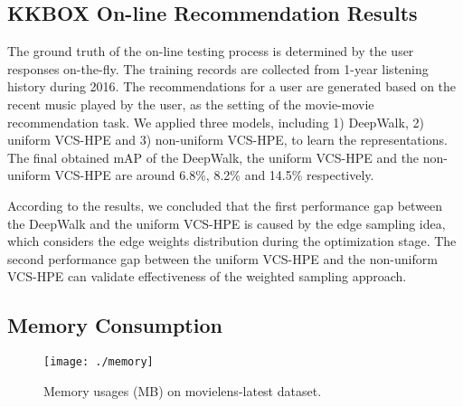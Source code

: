 \subsection{KKBOX On-line Recommendation Results}

The ground truth of the on-line testing process is determined by the user responses on-the-fly.  The training records are collected from 1-year listening history during 2016.  The recommendations for a user are generated based on the recent music played by the user, as the setting of the movie-movie recommendation task.  We applied three models, including 1) DeepWalk, 2) uniform VCS-HPE and 3) non-uniform VCS-HPE, to learn the representations.  The final obtained mAP of the DeepWalk, the uniform VCS-HPE and the non-uniform VCS-HPE are around 6.8\%, 8.2\% and 14.5\% respectively.

According to the results, we concluded that the first performance gap between the DeepWalk and the uniform VCS-HPE is caused by the edge sampling idea, which considers the edge weights distribution during the optimization stage.  The second performance gap between the uniform VCS-HPE and the non-uniform VCS-HPE can validate effectiveness of the weighted sampling approach.

\subsection{Memory Consumption}

\begin{figure}
\centering
\texttt{[image: ./memory]}
\caption{Memory usages (MB) on movielens-latest dataset.}
\label{fig:memory}
\end{figure}


